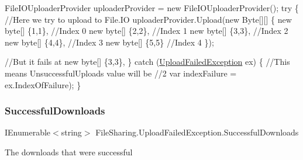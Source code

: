 \begin{DoxyCode}
FileIOUploaderProvider uploaderProvider = \textcolor{keyword}{new} FileIOUploaderProvider();
\textcolor{keywordflow}{try}
\{
    \textcolor{comment}{//Here we try to upload to File.IO}
    uploaderProvider.Upload(\textcolor{keyword}{new} Byte[][]
                            \{
                            \textcolor{keyword}{new} byte[] \{1,1\}, \textcolor{comment}{//Index 0}
                            \textcolor{keyword}{new} byte[] \{2,2\}, \textcolor{comment}{//Index 1}
                            \textcolor{keyword}{new} byte[] \{3,3\}, \textcolor{comment}{//Index 2}
                            \textcolor{keyword}{new} byte[] \{4,4\}, \textcolor{comment}{//Index 3}
                            \textcolor{keyword}{new} byte[] \{5,5\}  \textcolor{comment}{//Index 4}
                            \});

    \textcolor{comment}{//But it fails at new byte[] \{3,3\},}
\}
\textcolor{keywordflow}{catch} (\hyperlink{class_file_sharing_1_1_upload_failed_exception_a695f2b76a11171b4ac7b749eeeb8f09b}{UploadFailedException} ex)
\{
    \textcolor{comment}{//This means UnsuccessfulUploads value will be }
    \textcolor{comment}{//2}
    var indexFailure = ex.IndexOfFailure);
\}        
\end{DoxyCode}
 \mbox{\label{class_file_sharing_1_1_upload_failed_exception_a95a4b29d6b42b184e5c66659e3873e71}} 
\subsubsection{\texorpdfstring{Successful\+Downloads}{SuccessfulDownloads}}
{\footnotesize\ttfamily I\+Enumerable$<$string$>$ File\+Sharing.\+Upload\+Failed\+Exception.\+Successful\+Downloads\hspace{0.3cm}{\ttfamily [get]}}



The downloads that were successful 

\mbox{\label{class_file_sharing_1_1_upload_failed_exception_a8317cfafa75e732f435c85c50927ce79}} 
